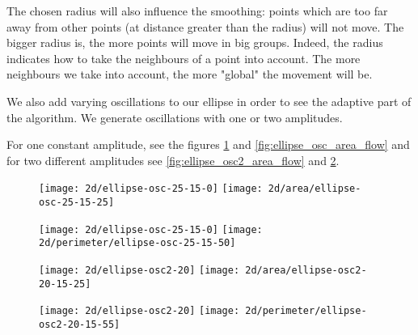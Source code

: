 The chosen radius will also influence the smoothing: points which are too far
away from other points (at distance greater than the radius) will not move. The
bigger radius is, the more points will move in big groups. Indeed, the
radius indicates how to take the neighbours of a point into account. The more
neighbours we take into account, the more "global" the movement will be.

We also add varying oscillations to our ellipse in order to see the
adaptive part of the algorithm. We generate oscillations with one or two
amplitudes.

For one constant amplitude, see the figures \ref{fig:ellipse_osc_perimeter_flow} and
\ref{fig:ellipse_osc_area_flow} and for two different amplitudes see
\ref{fig:ellipse_osc2_area_flow} and \ref{fig:ellipse_osc2_perimeter_flow}.

\begin{figure}[h]
    \centering

    \texttt{[image: 2d/ellipse-osc-25-15-0]}
    \texttt{[image: 2d/area/ellipse-osc-25-15-25]}
    \label{fig:ellipse_osc_area_flow}

    \texttt{[image: 2d/ellipse-osc-25-15-0]}
    \texttt{[image: 2d/perimeter/ellipse-osc-25-15-50]}
    \label{fig:ellipse_osc_perimeter_flow}
\end{figure}

\begin{figure}[h]
    \centering

    \texttt{[image: 2d/ellipse-osc2-20]}
    \texttt{[image: 2d/area/ellipse-osc2-20-15-25]}
    \label{fig:ellipse_osc2_area_flow}

    \texttt{[image: 2d/ellipse-osc2-20]}
    \texttt{[image: 2d/perimeter/ellipse-osc2-20-15-55]}
    \label{fig:ellipse_osc2_perimeter_flow}
\end{figure}

